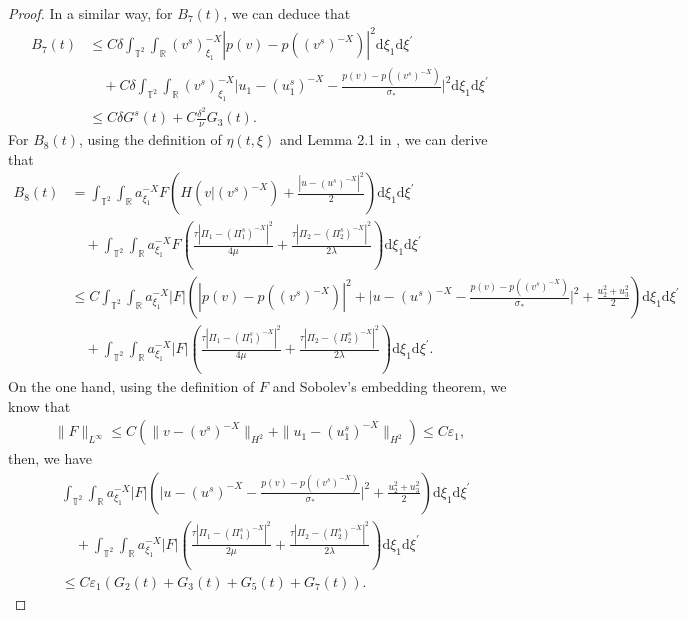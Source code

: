 \documentclass[10pt,reqno]{amsart}
\numberwithin{equation}{section}
\newcommand{\dif}{\mathrm{d}}
\begin{document}
\begin{proof}
In a similar way, for $B_7(t)$, we can deduce that
\begin{align*}
B_7(t)
&\le C\delta\int_{\mathbb{T}^2}\int_{\mathbb{R}}(v^s)^{-X}_{\xi_1}|p(v)-p((v^s)^{-X})|^2\dif \xi_1\dif \xi^{\prime}\\
&\quad+C\delta\int_{\mathbb{T}^2}\int_{\mathbb{R}}(v^s)^{-X}_{\xi_1}\Big|u_1-(u_1^s)^{-X}
-\frac{p(v)-p((v^s)^{-X})}{\sigma_\ast}\Big|^2\dif \xi_1\dif \xi^{\prime}\\
&\le C\delta G^s(t)+C\frac{\delta^2}{\nu}G_3(t).
\end{align*}
For $B_8(t)$, using the definition of $\eta(t, \xi)$ and Lemma 2.1 in \cite{WY}, we can derive that
\begin{align*}
B_8(t)
&= \int_{\mathbb{T}^2}\int_{\mathbb{R}}a^{-X}_{\xi_1}F\left(H(v|(v^s)^{-X})+\frac{|u-(u^s)^{-X}|^2}{2}
\right)\dif \xi_1\dif \xi^{\prime}\\
&\quad+\int_{\mathbb{T}^2}\int_{\mathbb{R}}a^{-X}_{\xi_1}F\left(
\frac{\tau|\Pi_1-(\Pi_1^s)^{-X}|^2}{4\mu}+\frac{\tau|\Pi_2-(\Pi_2^s)^{-X}|^2}{2\lambda}\right)\dif \xi_1\dif \xi^{\prime}\\
&\le C\int_{\mathbb{T}^2}\int_{\mathbb{R}}a^{-X}_{\xi_1}|F|\left(|p(v)-p((v^s)^{-X})|^2+
\Big|u-(u^s)^{-X}-\frac{p(v)-p((v^s)^{-X})}{\sigma_\ast}\Big|^2+\frac{u_2^2+u_3^2}{2}
\right)\dif \xi_1\dif \xi^{\prime}\\
&\quad+\int_{\mathbb{T}^2}\int_{\mathbb{R}}a^{-X}_{\xi_1}|F|\left(
\frac{\tau|\Pi_1-(\Pi_1^s)^{-X}|^2}{4\mu}+\frac{\tau|\Pi_2-(\Pi_2^s)^{-X}|^2}{2\lambda}\right)\dif \xi_1\dif \xi^{\prime}.
\end{align*}
On the one hand, using the definition of $F$ and Sobolev's embedding theorem, we know that
\begin{align*}
\|F\|_{L^\infty}
\le C\left(\|v-(v^s)^{-X}\|_{H^2}+\|u_1-(u_1^s)^{-X}\|_{H^2}\right)\le C\varepsilon_1,
\end{align*}
then, we have
\begin{align*}
&\int_{\mathbb{T}^2}\int_{\mathbb{R}}a^{-X}_{\xi_1}|F|\left(
\Big|u-(u^s)^{-X}-\frac{p(v)-p((v^s)^{-X})}{\sigma_\ast}\Big|^2+\frac{u_2^2+u_3^2}{2}
\right)\dif \xi_1\dif \xi^{\prime}\\
&\quad+\int_{\mathbb{T}^2}\int_{\mathbb{R}}a^{-X}_{\xi_1}|F|\left(
\frac{\tau|\Pi_1-(\Pi_1^s)^{-X}|^2}{2\mu}+\frac{\tau|\Pi_2-(\Pi_2^s)^{-X}|^2}{2\lambda}\right)\dif \xi_1\dif \xi^{\prime}\\
&\le C\varepsilon_1\left(G_2(t)+G_3(t)+G_5(t)+G_7(t)\right).

\end{align*}
\end{proof}
\end{document}
